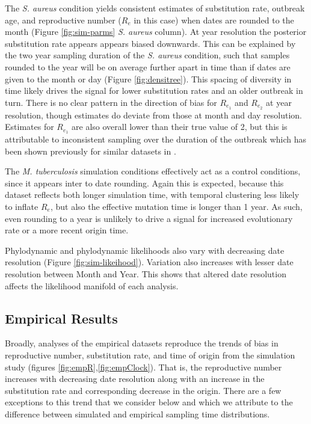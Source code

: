 \documentclass{article}
\begin{document}
\begin{spacing}{1.5}
The \textit{S. aureus} condition yields consistent estimates of substitution rate, outbreak age, and reproductive number ($R_e$ in this case) when dates are rounded to the month (Figure \ref{fig:sim-parms} \textit{S. aureus} column). At year resolution the posterior substitution rate appears appears biased downwards. This can be explained by the two year sampling duration of the \textit{S. aureus} condition, such that samples rounded to the year will be on average further apart in time than if dates are given to the month or day (Figure \ref{fig:densitree}). This spacing of diversity in time likely drives the signal for lower substitution rates and an older outbreak in turn. There is no clear pattern in the direction of bias for $R_{e_1}$ and $R_{e_2}$ at year resolution, though estimates do deviate from those at month and day resolution. Estimates for $R_{e_1}$ are also overall lower than their true value of 2, but this is attributable to inconsistent sampling over the duration of the outbreak which has been shown previously for similar datasets in \cite{featherstone_infectious_2021}.

The \textit{M. tuberculosis} simulation conditions effectively act as a control conditions, since it appears inter to date rounding. Again this is expected, because this dataset reflects both longer simulation time, with temporal clustering less likely to inflate $R_e$, but also the effective mutation time is longer than 1 year. As such, even rounding to a year is unlikely to drive a signal for increased evolutionary rate or a more recent origin time.

Phylodynamic and phylodynamic likelihoods also vary with decreasing date resolution (Figure \ref{fig:sim-likeihood}). Variation also increases with lesser date resolution between Month and Year. This shows that altered date resolution affects the likelihood manifold of each analysis.

\subsection*{Empirical Results}

Broadly, analyses of the empirical datasets reproduce the trends of bias in reproductive number, substitution rate, and time of origin from the simulation study (figures \ref{fig:empR},\ref{fig:empClock}). That is, the reproductive number increases with decreasing date resolution along with an increase in the substitution rate and corresponding decrease in the origin. There are a few exceptions to this trend that we consider below and which we attribute to the difference between simulated and empirical sampling time distributions.


\end{spacing}
\end{document}
